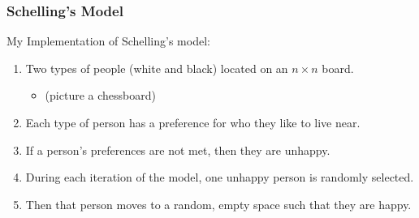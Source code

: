 \documentclass[11pt, handout]{beamer}
\begin{document}
\begin{frame}
    \frametitle{Schelling's Model}
    My Implementation of Schelling's model:
    \begin{enumerate}
        \item Two types of people (white and black) located on an $n \times n$ board.
            \begin{itemize}
                \item (picture a chessboard)
            \end{itemize}
        \item Each type of person has a preference for who they like to live near.
        \item If a person's preferences are not met, then they are unhappy.
        \item During each iteration of the model, one unhappy person is randomly selected.
        \item Then that person moves to a random, empty space such that they are happy.
    \end{enumerate}
\end{frame}
\end{document}

